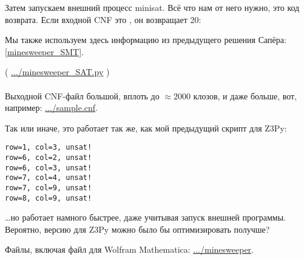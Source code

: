 Затем запускаем внешний процесс minisat.
Всё что нам от него нужно, это код возврата.
Если входной \ac{CNF} это , он возвращает 20:

Мы также используем здесь информацию из предыдущего решения Сапёра: \ref{minesweeper_SMT}.



( \url{.../minesweeper_SAT.py} ) \\
\\
Выходной \ac{CNF}-файл большой, вплоть до $\approx 2000$ клозов, и даже больше, вот, например: \url{.../sample.cnf}.

Так или иначе, это работает так же, как мой предыдущий скрипт для Z3Py:

\begin{lstlisting}
row=1, col=3, unsat!
row=6, col=2, unsat!
row=6, col=3, unsat!
row=7, col=4, unsat!
row=7, col=9, unsat!
row=8, col=9, unsat!
\end{lstlisting}

\dots но работает намного быстрее, даже учитывая запуск внешней программы.
Вероятно, версию для Z3Py можно было бы оптимизировать получше?

Файлы, включая файл для Wolfram Mathematica: \url{.../minesweeper}.

